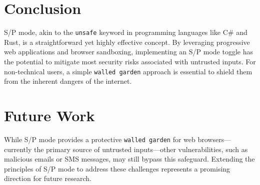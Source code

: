 \section{Conclusion}
\label{sec:conclusion}

S/P mode, akin to the \texttt{unsafe} keyword in programming languages like C\# and Rust, is a straightforward yet highly effective concept. By leveraging progressive web applications and browser sandboxing, implementing an S/P mode toggle has the potential to mitigate most security risks associated with untrusted inputs. For non-technical users, a simple \texttt{walled garden} approach is essential to shield them from the inherent dangers of the internet.

\section{Future Work}
While S/P mode provides a protective \texttt{walled garden} for web browsers—currently the primary source of untrusted inputs—other vulnerabilities, such as malicious emails or SMS messages, may still bypass this safeguard. Extending the principles of S/P mode to address these challenges represents a promising direction for future research.




